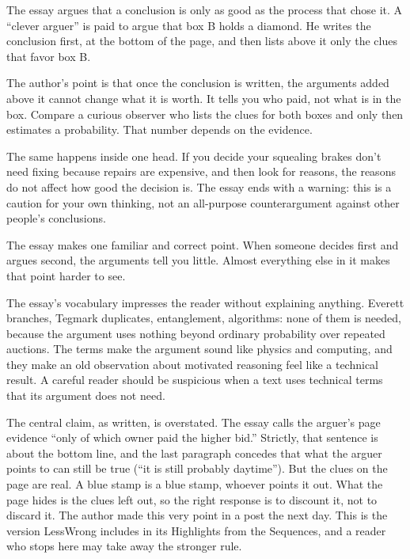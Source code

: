 \begin{afterword}
\summaryhead

The essay argues that a conclusion is only as good as the process that chose it. A ``clever arguer'' is paid to argue that box B holds a diamond. He writes the conclusion first, at the bottom of the page, and then lists above it only the clues that favor box B.

The author's point is that once the conclusion is written, the arguments added above it cannot change what it is worth. It tells you who paid, not what is in the box. Compare a curious observer who lists the clues for both boxes and only then estimates a probability. That number depends on the evidence.

The same happens inside one head. If you decide your squealing brakes don't need fixing because repairs are expensive, and then look for reasons, the reasons do not affect how good the decision is. The essay ends with a warning: this is a caution for your own thinking, not an all-purpose counterargument against other people's conclusions.

\responsehead

The essay makes one familiar and correct point. When someone decides first and argues second, the arguments tell you little. Almost everything else in it makes that point harder to see.

The essay's vocabulary impresses the reader without explaining anything. Everett branches, Tegmark duplicates, entanglement, algorithms: none of them is needed, because the argument uses nothing beyond ordinary probability over repeated auctions. The terms make the argument sound like physics and computing, and they make an old observation about motivated reasoning feel like a technical result. A careful reader should be suspicious when a text uses technical terms that its argument does not need.

The central claim, as written, is overstated. The essay calls the arguer's page evidence ``only of which owner paid the higher bid.'' Strictly, that sentence is about the bottom line, and the last paragraph concedes that what the arguer points to can still be true (``it is still probably daytime''). But the clues on the page are real. A blue stamp is a blue stamp, whoever points it out. What the page hides is the clues left out, so the right response is to discount it, not to discard it. The author made this very point in a post the next day. This is the version LessWrong includes in its Highlights from the Sequences, and a reader who stops here may take away the stronger rule.


\end{afterword}
